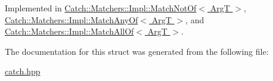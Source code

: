 Implemented in \hyperlink{struct_catch_1_1_matchers_1_1_impl_1_1_match_not_of_a181d693c0258e582d80dc6117a1f2b66}{Catch\-::\-Matchers\-::\-Impl\-::\-Match\-Not\-Of$<$ Arg\-T $>$}, \hyperlink{struct_catch_1_1_matchers_1_1_impl_1_1_match_any_of_a8a3e8338f979e56277dcf553efb78dc0}{Catch\-::\-Matchers\-::\-Impl\-::\-Match\-Any\-Of$<$ Arg\-T $>$}, and \hyperlink{struct_catch_1_1_matchers_1_1_impl_1_1_match_all_of_acfb377bda2c58ae62e6df9c3a8a89f8f}{Catch\-::\-Matchers\-::\-Impl\-::\-Match\-All\-Of$<$ Arg\-T $>$}.



The documentation for this struct was generated from the following file\-:\begin{DoxyCompactItemize}
\item 
\hyperlink{catch_8hpp}{catch.\-hpp}\end{DoxyCompactItemize}
